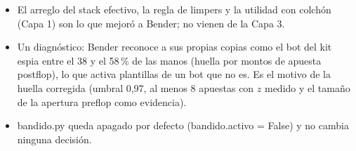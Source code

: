 \documentclass[10.5pt,a4paper]{article}
\newcommand{\code}[1]{{\ttfamily\small #1}}
\begin{document}
\begin{itemize}[leftmargin=1.4em,itemsep=2pt]
\item El arreglo del stack efectivo, la regla de limpers y la utilidad con colchón (Capa 1) son lo que mejoró a Bender; no vienen de la Capa 3.
\item Un diagnóstico: Bender reconoce a sus propias copias como el bot del kit \code{espia} entre el 38 y el 58\,\% de las manos (huella por montos de apuesta postflop), lo que activa plantillas de un bot que no es. Es el motivo de la huella corregida (umbral 0,97, al menos 8 apuestas con $z$ medido y el tamaño de la apertura preflop como evidencia).
\item \code{bandido.py} queda apagado por defecto (\code{bandido.activo = False}) y no cambia ninguna decisión.
\end{itemize}
\end{document}
